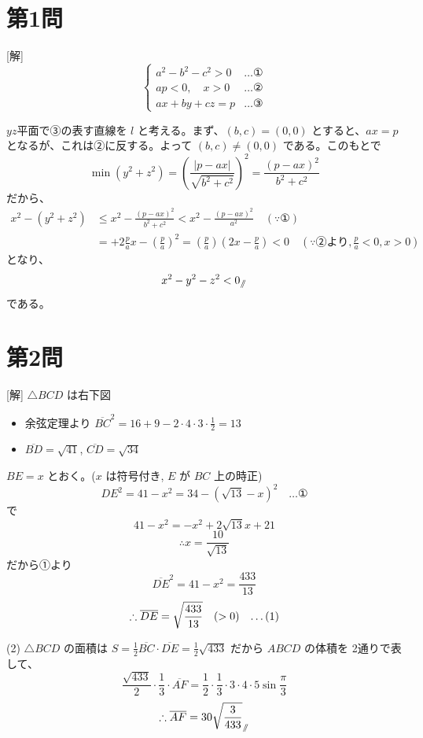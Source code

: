 \documentclass[../main.tex]{subfiles}
\begin{document}
\section*{第1問}

[解]
\[
  \begin{cases}
    a^2 - b^2 - c^2 > 0 & \dots \text{①} \\
    ap < 0, \quad x > 0 & \dots \text{②} \\
    ax + by + cz = p & \dots \text{③}
  \end{cases}
\]

$yz$平面で③の表す直線を $l$ と考える。まず、$(b, c) = (0, 0)$ とすると、$ax = p$ となるが、これは②に反する。よって $(b, c) \neq (0, 0)$ である。このもとで
\[
  \min (y^2 + z^2) = \left( \frac{|p - ax|}{\sqrt{b^2 + c^2}} \right)^2 = \frac{(p - ax)^2}{b^2 + c^2}
\]
だから、
\begin{align*}
  x^2 - (y^2 + z^2) &\le x^2 - \frac{(p - ax)^2}{b^2 + c^2} < x^2 - \frac{(p - ax)^2}{a^2} \quad (\because \text{①}) \\
  &= + 2 \frac{p}{a} x - \left( \frac{p}{a} \right)^2 = \left( \frac{p}{a} \right) \left( 2x - \frac{p}{a} \right) < 0 \quad (\because \text{②より}, \frac{p}{a} < 0, x > 0)
\end{align*}
となり、
\[
  x^2 - y^2 - z^2 < 0_{\mathbin{/\mkern-6mu/}}
\]
である。

\section*{第2問}

[解] $\triangle BCD$ は右下図
\begin{itemize}
  \item 余弦定理より $\overline{BC}^2 = 16 + 9 - 2 \cdot 4 \cdot 3 \cdot \frac{1}{2} = 13$
  \item $\overline{BD} = \sqrt{41}$, $\overline{CD} = \sqrt{34}$
\end{itemize}

$BE = x$ とおく。($x$ は符号付き, $E$ が $BC$ 上の時正)
\[
  DE^2 = 41 - x^2 = 34 - (\sqrt{13} - x)^2 \quad \dots \text{①}
\]
で
\[
  41 - x^2 = -x^2 + 2\sqrt{13}x + 21
\]
\[
  \therefore x = \frac{10}{\sqrt{13}}
\]
だから①より
\[
  \overline{DE}^2 = 41 - x^2 = \frac{433}{13}
\]
\[
  \therefore \overline{DE} = \sqrt{\frac{433}{13}} \quad (> 0) \quad \text{\dots (1)}
\]

\noindent
(2) $\triangle BCD$ の面積は $S = \frac{1}{2} \overline{BC} \cdot \overline{DE} = \frac{1}{2}\sqrt{433}$ だから $ABCD$ の体積を 2通りで表して、
\[
  \frac{\sqrt{433}}{2} \cdot \frac{1}{3} \cdot \overline{AF} = \frac{1}{2} \cdot \frac{1}{3} \cdot 3 \cdot 4 \cdot 5 \sin \frac{\pi}{3}
\]
\[
  \therefore \overline{AF} = 30 \sqrt{\frac{3}{433}}_{\mathbin{/\mkern-6mu/}}
\]
\end{document}
